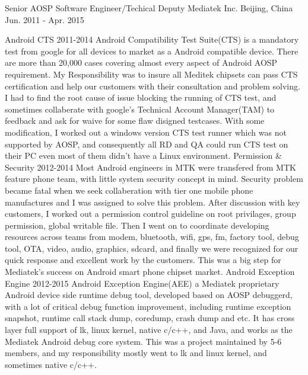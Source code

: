 \begin{cventries}
  \cventry
    {Senior AOSP Software Engineer/Techical Deputy} %
    {Mediatek Inc.} %
    {Beijing, China} %
    {Jun. 2011 - Apr. 2015} %
    {
      \begin{cvsubentries} %
        \cvsubentry
          {}
          {Android CTS}
          {2011-2014}
          {Android Compatibility Test Suite(CTS) is a mandatory test from google for all devices to market as a Android compatible device. There are more than 20,000 cases covering almost every aspect of Android AOSP requirement. My Responsibility was to insure all Meditek chipsets can pass CTS certification and help our customers with their consultation and problem solving. I had to find the root cause of issue blocking the running of CTS test, and sometimes collaberate with google's Technical Account Manager(TAM) to feedback and ask for waive for some flaw disigned testcases. With some modification, I worked out a windows version CTS test runner which was not supported by AOSP, and consequently all RD and QA could run CTS test on their PC even most of them didn't have a Linux environment.}
        \cvsubentry
          {}
          {Permission \& Security}
          {2012-2014}
          {Most Android engineers in MTK were transfered from MTK feature phone team, with little system security concept in mind. Security problem became fatal when we seek collaberation with tier one mobile phone manufactures and I was assigned to solve this problem. After discussion with key customers, I worked out a permission control guideline on root privilages, group permission, global writable file. Then I went on to coordinate developing resources across teams from modem, bluetooth, wifi, gps, fm, factory tool, debug tool, OTA, video, audio, graphics, sdcard, and finally we were recognized for our quick response and excellent work by the customers. This was a big step for Mediatek's success on Android smart phone chipset market.}
        \cvsubentry
          {}
          {Android Exception Engine}
          {2012-2015}
          {Android Exception Engine(AEE) a Mediatek proprietary Android device side runtime debug tool, developed based on AOSP debuggerd, with a lot of critical debug function improvement, including runtime exception snapshot, runtime call stack dump, coredump, crash dump and etc. It has cross layer full support of lk, linux kernel, native c/c++, and Java, and works as the Mediatek Android debug core system. This was a project maintained by 5-6 members, and my responsibility mostly went to lk and linux kernel, and sometimes native c/c++.}

\end{cvsubentries}}
\end{cventries}
